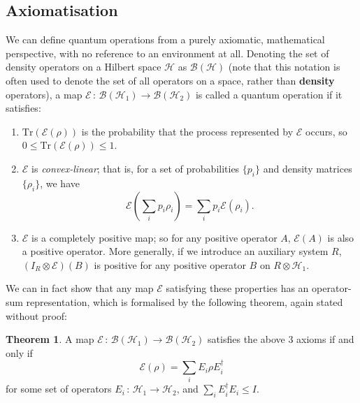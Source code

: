 \documentclass[12pt,a4paper]{report}
\numberwithin{equation}{section}
\theoremstyle{definition}
\theoremstyle{theorem}
\newtheorem{theorem}{Theorem}[section]
\theoremstyle{theorem}
\theoremstyle{example}
\theoremstyle{definition}
\begin{document}
\subsection{Axiomatisation}
We can define quantum operations from a purely axiomatic, mathematical perspective, with no reference to an environment at all. Denoting the set of density operators on a Hilbert space $\mathcal{H}$ as $\mathcal{B}(\mathcal{H})$ (note that this notation is often used to denote the set of all operators on a space, rather than \textbf{density} operators), a map $\mathcal{E}\,:\,\mathcal{B}(\mathcal{H}_{1})\to\mathcal{B}(\mathcal{H}_{2})$ is called a quantum operation if it satisfies:
\begin{enumerate}
	\item $\text{Tr}(\mathcal{E}(\rho))$ is the probability that the process represented by $\mathcal{E}$ occurs, so $0\leq\text{Tr}(\mathcal{E}(\rho))\leq 1$.
	\item $\mathcal{E}$ is \textit{convex-linear}; that is, for a set of probabilities $\{p_{i}\}$ and density matrices $\{\rho_{i}\}$, we have
	\begin{equation}
		\mathcal{E}\left(\sum_{i}p_{i}\rho_{i}\right)=\sum_{i}p_{i}\mathcal{E}(\rho_{i}).
	\end{equation}
	\item $\mathcal{E}$ is a completely positive map; so for any positive operator $A$, $\mathcal{E}(A)$ is also a positive operator. More generally, if we introduce an auxiliary system $R$, $(I_{R}\otimes \mathcal{E})(B)$ is positive for any positive operator $B$ on $R\otimes\mathcal{H}_{1}$.
\end{enumerate} 
We can in fact show that any map $\mathcal{E}$ satisfying these properties has an operator-sum representation, which is formalised by the following theorem, again stated without proof:
\begin{theorem}
	A map $\mathcal{E}\,:\,\mathcal{B}(\mathcal{H}_{1})\to\mathcal{B}(\mathcal{H}_{2})$ satisfies the above 3 axioms if and only if
	\begin{equation}
		\mathcal{E}(\rho)=\sum_{i}E_{i}\rho E_{i}^{\dagger}
	\end{equation}
	for some set of operators $E_{i}\,:\,\mathcal{H}_{1}\to\mathcal{H}_{2}$, and $\sum_{i}E_{i}^{\dagger}E_{i}\leq I$.
\end{theorem}
\end{document}
